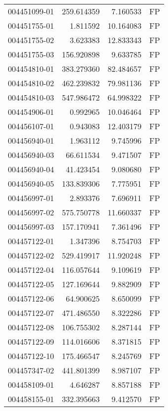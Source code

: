 \begin{tabular}{lrrl}
004451099-01 &  259.614359 &       7.160533 &   FP \\
004451755-01 &    1.811592 &      10.164083 &   FP \\
004451755-02 &    3.623383 &      12.833343 &   FP \\
004451755-03 &  156.920898 &       9.633785 &   FP \\
004454810-01 &  383.279360 &      82.484657 &   FP \\
004454810-02 &  462.239832 &      79.981136 &   FP \\
004454810-03 &  547.986472 &      64.998322 &   FP \\
004454906-01 &    0.992965 &      10.046464 &   FP \\
004456107-01 &    0.943083 &      12.403179 &   FP \\
004456940-01 &    1.963112 &       9.745996 &   FP \\
004456940-03 &   66.611534 &       9.471507 &   FP \\
004456940-04 &   41.423454 &       9.080680 &   FP \\
004456940-05 &  133.839306 &       7.775951 &   FP \\
004456997-01 &    2.893376 &       7.696911 &   FP \\
004456997-02 &  575.750778 &      11.660337 &   FP \\
004456997-03 &  157.170941 &       7.361496 &   FP \\
004457122-01 &    1.347396 &       8.754703 &   FP \\
004457122-02 &  529.419917 &      11.920248 &   FP \\
004457122-04 &  116.057644 &       9.109619 &   FP \\
004457122-05 &  127.169644 &       9.882909 &   FP \\
004457122-06 &   64.900625 &       8.650099 &   FP \\
004457122-07 &  471.486550 &       8.322286 &   FP \\
004457122-08 &  106.755302 &       8.287144 &   FP \\
004457122-09 &  114.016606 &       8.371815 &   FP \\
004457122-10 &  175.466547 &       8.245769 &   FP \\
004457347-02 &  441.801399 &       8.987107 &   FP \\
004458109-01 &    4.646287 &       8.857188 &   FP \\
004458155-01 &  332.395663 &       9.412570 &   FP \\

\end{tabular}
